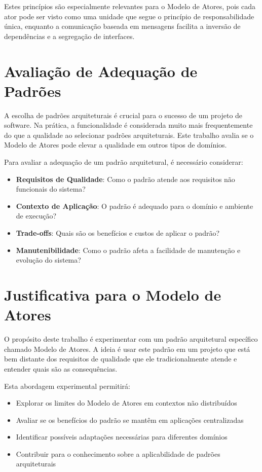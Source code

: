 Estes princípios são especialmente relevantes para o Modelo de Atores, pois cada ator pode ser visto como uma unidade que segue o princípio de responsabilidade única, enquanto a comunicação baseada em mensagens facilita a inversão de dependências e a segregação de interfaces.

\section{Avaliação de Adequação de Padrões}

A escolha de padrões arquiteturais é crucial para o sucesso de um projeto de software. Na prática, a funcionalidade é considerada muito mais frequentemente do que a qualidade ao selecionar padrões arquiteturais. Este trabalho avalia se o Modelo de Atores pode elevar a qualidade em outros tipos de domínios.

Para avaliar a adequação de um padrão arquitetural, é necessário considerar:

\begin{itemize}
    \item \textbf{Requisitos de Qualidade}: Como o padrão atende aos requisitos não funcionais do sistema?
    
    \item \textbf{Contexto de Aplicação}: O padrão é adequado para o domínio e ambiente de execução?
    
    \item \textbf{Trade-offs}: Quais são os benefícios e custos de aplicar o padrão?
    
    \item \textbf{Manutenibilidade}: Como o padrão afeta a facilidade de manutenção e evolução do sistema?
\end{itemize}

\section{Justificativa para o Modelo de Atores}

O propósito deste trabalho é experimentar com um padrão arquitetural específico chamado Modelo de Atores. A ideia é usar este padrão em um projeto que está bem distante dos requisitos de qualidade que ele tradicionalmente atende e entender quais são as consequências.

Esta abordagem experimental permitirá:

\begin{itemize}
    \item Explorar os limites do Modelo de Atores em contextos não distribuídos
    \item Avaliar se os benefícios do padrão se mantêm em aplicações centralizadas
    \item Identificar possíveis adaptações necessárias para diferentes domínios
    \item Contribuir para o conhecimento sobre a aplicabilidade de padrões arquiteturais
\end{itemize}

